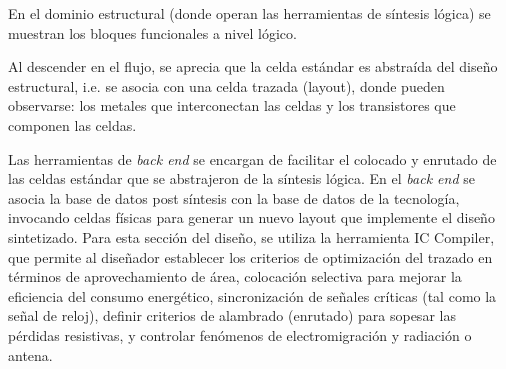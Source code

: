 En el dominio estructural (donde operan las herramientas de síntesis lógica) se muestran los bloques funcionales a nivel lógico.

Al descender en el flujo, se aprecia que la celda estándar es abstraída del diseño estructural, i.e. se asocia con una celda trazada (layout), donde pueden observarse: los metales que interconectan las celdas y los transistores que componen las celdas.

Las herramientas de \textit{back end} se encargan de facilitar el colocado y enrutado de las celdas estándar que se abstrajeron de la síntesis lógica. En el \textit{back end} se asocia la base de datos post síntesis con la base de datos de la tecnología, invocando celdas físicas para generar un nuevo layout que implemente el diseño sintetizado. Para esta sección del diseño, se utiliza la herramienta IC Compiler, que permite al diseñador establecer los criterios de optimización del trazado en términos de aprovechamiento de área, colocación selectiva para mejorar la eficiencia del consumo energético, sincronización de señales críticas (tal como la señal de reloj), definir criterios de alambrado (enrutado) para sopesar las pérdidas resistivas, y controlar fenómenos de electromigración y radiación o antena.




